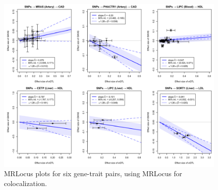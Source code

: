 \documentclass[11pt]{article}
\begin{document}
\begin{figure}[!ht]
  \centering
  \includegraphics[width=\textwidth]{figs/real_loci_mrlocus.png}
  \caption{MRLocus plots for six gene-trait pairs, using MRLocus for colocalization.}
\end{figure}
\end{document}
